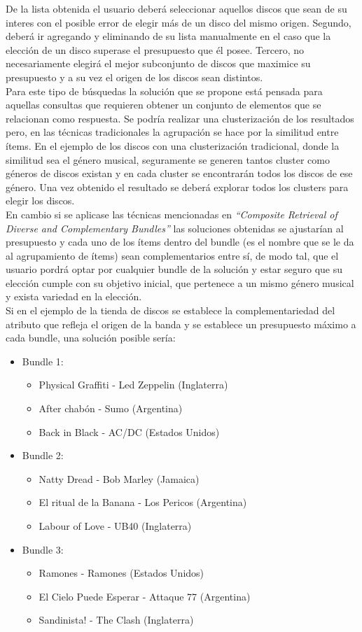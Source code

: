 De la lista obtenida el usuario deberá seleccionar aquellos discos que sean de su interes con el posible error de elegir más de un disco del mismo origen. Segundo, deberá ir agregando y eliminando de su lista manualmente en el caso que la elección de un disco superase el presupuesto que él posee. Tercero, no necesariamente elegirá el mejor subconjunto de discos que maximice su presupuesto y a su vez el origen de los discos sean distintos.\\
Para este tipo de búsquedas la solución que se propone está pensada para aquellas consultas que requieren obtener un conjunto de elementos que se relacionan como respuesta. Se podría realizar una clusterización de los resultados pero, en las técnicas tradicionales la agrupación se hace por la similitud entre ítems. En el ejemplo de los discos con una clusterización tradicional, donde la similitud sea el género musical, seguramente se generen tantos cluster como géneros de discos existan y en cada cluster se encontrarán todos los discos de ese género. Una vez obtenido el resultado se deberá explorar todos los clusters para elegir los discos.\\
En cambio si se aplicase las técnicas mencionadas en \textit{``Composite Retrieval of Diverse and Complementary Bundles''} las soluciones obtenidas se ajustarían al presupuesto y cada uno de los ítems dentro del bundle (es el nombre que se le da al agrupamiento de ítems) sean complementarios entre sí, de modo tal, que el usuario pordrá optar por cualquier bundle de la solución y estar seguro que su elección cumple con su objetivo inicial, que pertenece a un mismo género musical y exista variedad en la elección.\\
Si en el ejemplo de la tienda de discos se establece la complementariedad del atributo que refleja el origen de la banda y se establece un presupuesto máximo a cada bundle, una solución posible sería:
\begin{itemize}
  \item Bundle 1:
  \begin{itemize}
    \item Physical Graffiti - Led Zeppelin (Inglaterra)
    \item After chabón - Sumo (Argentina)
    \item Back in Black - AC/DC (Estados Unidos)
  \end{itemize}
  \item Bundle 2:
  \begin{itemize}
    \item Natty Dread - Bob Marley (Jamaica)
    \item El ritual de la Banana - Los Pericos (Argentina)
    \item Labour of Love - UB40 (Inglaterra)
  \end{itemize}
	  \item Bundle 3:
  \begin{itemize}
    \item Ramones - Ramones (Estados Unidos)
    \item El Cielo Puede Esperar - Attaque 77 (Argentina)
    \item Sandinista! - The Clash (Inglaterra)
  \end{itemize}
\end{itemize}
